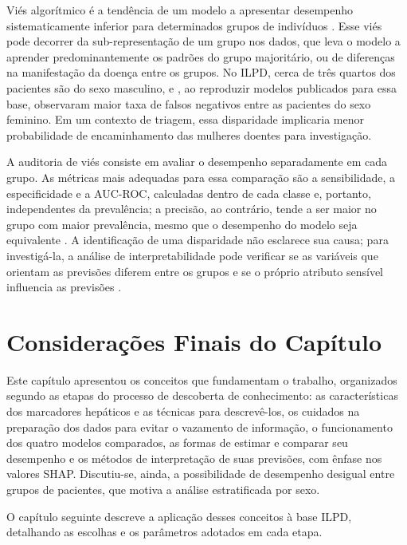 Viés algorítmico é a tendência de um modelo a apresentar desempenho sistematicamente inferior para determinados grupos de indivíduos \cite{Rajkomar2018Ensuring}. Esse viés pode decorrer da sub-representação de um grupo nos dados, que leva o modelo a aprender predominantemente os padrões do grupo majoritário, ou de diferenças na manifestação da doença entre os grupos. No ILPD, cerca de três quartos dos pacientes são do sexo masculino, e , ao reproduzir modelos publicados para essa base, observaram maior taxa de falsos negativos entre as pacientes do sexo feminino. Em um contexto de triagem, essa disparidade implicaria menor probabilidade de encaminhamento das mulheres doentes para investigação.

A auditoria de viés consiste em avaliar o desempenho separadamente em cada grupo. As métricas mais adequadas para essa comparação são a sensibilidade, a especificidade e a AUC-ROC, calculadas dentro de cada classe e, portanto, independentes da prevalência; a precisão, ao contrário, tende a ser maior no grupo com maior prevalência, mesmo que o desempenho do modelo seja equivalente \cite{FAWCETT2006861}. A identificação de uma disparidade não esclarece sua causa; para investigá-la, a análise de interpretabilidade pode verificar se as variáveis que orientam as previsões diferem entre os grupos e se o próprio atributo sensível influencia as previsões \cite{investigatingbiashealth}.

\section{Considerações Finais do Capítulo}
\label{sec:fund_consideracoes}

Este capítulo apresentou os conceitos que fundamentam o trabalho, organizados segundo as etapas do processo de descoberta de conhecimento: as características dos marcadores hepáticos e as técnicas para descrevê-los, os cuidados na preparação dos dados para evitar o vazamento de informação, o funcionamento dos quatro modelos comparados, as formas de estimar e comparar seu desempenho e os métodos de interpretação de suas previsões, com ênfase nos valores SHAP. Discutiu-se, ainda, a possibilidade de desempenho desigual entre grupos de pacientes, que motiva a análise estratificada por sexo.

O capítulo seguinte descreve a aplicação desses conceitos à base ILPD, detalhando as escolhas e os parâmetros adotados em cada etapa.
